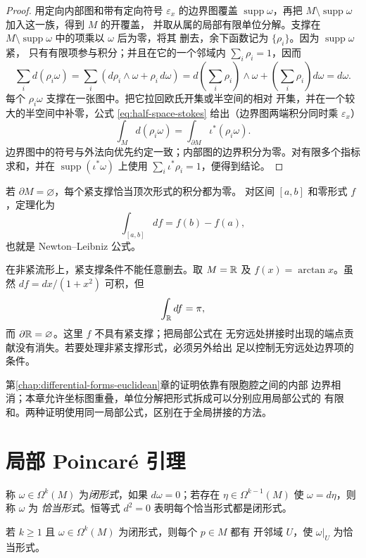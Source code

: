 \begin{proof}
用定向内部图和带有定向符号 $\varepsilon_x$ 的边界图覆盖 $\operatorname{supp}\omega$，再把
$M\setminus\operatorname{supp}\omega$ 加入这一族，得到 $M$ 的开覆盖，
并取从属的局部有限单位分解。支撑在
$M\setminus\operatorname{supp}\omega$ 中的项乘以 $\omega$ 后为零，将其
删去，余下函数记为 $\{\rho_i\}$。因为 $\operatorname{supp}\omega$ 紧，
只有有限项参与积分；并且在它的一个邻域内 $\sum_i\rho_i=1$，因而
\[
 \sum_i d(\rho_i\omega)
 =\sum_i(d\rho_i\wedge\omega+\rho_i\,d\omega)
 =d\left(\sum_i\rho_i\right)\wedge\omega
  +\left(\sum_i\rho_i\right)d\omega
 =d\omega.
\]
每个 $\rho_i\omega$ 支撑在一张图中。把它拉回欧氏开集或半空间的相对
开集，并在一个较大的半空间中补零，公式 \eqref{eq:half-space-stokes}
给出（边界图两端积分同时乘 $\varepsilon_x$）
\[
 \int_Md(\rho_i\omega)
 =\int_{\partial M}\iota^*(\rho_i\omega).
\]
边界图中的符号与外法向优先约定一致；内部图的边界积分为零。对有限多个指标
求和，并在 $\operatorname{supp}(\iota^*\omega)$ 上使用
$\sum_i\iota^*\rho_i=1$，便得到结论。
\end{proof}

若 $\partial M=\varnothing$，每个紧支撑恰当顶次形式的积分都为零。
对区间 $[a,b]$ 和零形式 $f$，定理化为
\[
 \int_{[a,b]}df=f(b)-f(a),
\]
也就是 Newton--Leibniz 公式。

在非紧流形上，紧支撑条件不能任意删去。取 \(M=\mathbb{R}\) 及
\(f(x)=\arctan x\)。虽然 \(df=dx/(1+x^2)\) 可积，但
\[
 \int_{\mathbb{R}}df=\pi,
\]
而 \(\partial\mathbb{R}=\varnothing\)。这里 \(f\) 不具有紧支撑；把局部公式在
无穷远处拼接时出现的端点贡献没有消失。若要处理非紧支撑形式，必须另外给出
足以控制无穷远处边界项的条件。

第\ref{chap:differential-forms-euclidean}章的证明依靠有限胞腔之间的内部
边界相消；本章允许坐标图重叠，单位分解把形式拆成可以分别应用局部公式的
有限和。两种证明使用同一局部公式，区别在于全局拼接的方法。

\section{局部 Poincaré 引理}

称 $\omega\in\Omega^k(M)$ 为\emph{闭形式}，如果 $d\omega=0$；若存在
$\eta\in\Omega^{k-1}(M)$ 使 $\omega=d\eta$，则称 $\omega$ 为
\emph{恰当形式}。恒等式 $d^2=0$ 表明每个恰当形式都是闭形式。

\begin{theorem}[局部 Poincaré 引理]\label{thm:local-poincare-manifold}
若 $k\ge1$ 且 $\omega\in\Omega^k(M)$ 为闭形式，则每个 $p\in M$ 都有
开邻域 $U$，使 $\omega|_U$ 为恰当形式。
\end{theorem}

